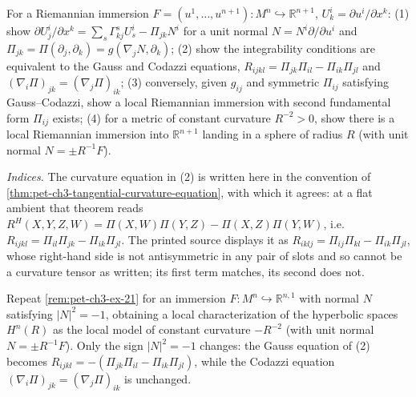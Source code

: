 \begin{remark}
  \label{rem:pet-ch3-ex-21}
  \leanok
  For a Riemannian immersion $F=(u^1,\dots,u^{n+1}):M^n\hookrightarrow\mathbb
  R^{n+1}$, $U^i_k=\partial u^i/\partial x^k$: (1) show
  $\partial U^i_j/\partial x^k=\sum_s\Gamma^s_{kj}U^i_s-\Pi_{jk}N^i$ for a unit normal
  $N=N^i\partial/\partial u^i$ and $\Pi_{jk}=\Pi(\partial_j,\partial_k)=g(\nabla_jN,\partial_k)$;
  (2) show the integrability conditions are equivalent to the Gauss and Codazzi
  equations, $R_{ijkl}=\Pi_{jk}\Pi_{il}-\Pi_{ik}\Pi_{jl}$ and
  $(\nabla_i\Pi)_{jk}=(\nabla_j\Pi)_{ik}$; (3) conversely, given
  $g_{ij}$ and symmetric $\Pi_{ij}$ satisfying Gauss--Codazzi, show a local
  Riemannian immersion with second fundamental form $\Pi_{ij}$ exists; (4) for a
  metric of constant curvature $R^{-2}>0$, show there is a local Riemannian
  immersion into $\mathbb R^{n+1}$ landing in a sphere of radius $R$ (with unit
  normal $N=\pm R^{-1}F$).

  \emph{Indices.} The curvature equation in (2) is written here in the convention
  of \cref{thm:pet-ch3-tangential-curvature-equation}, with which it agrees: at a
  flat ambient that theorem reads $R^H(X,Y,Z,W)=\Pi(X,W)\Pi(Y,Z)-\Pi(X,Z)\Pi(Y,W)$,
  i.e. $R_{ijkl}=\Pi_{il}\Pi_{jk}-\Pi_{ik}\Pi_{jl}$. The printed source displays
  it as $R_{iklj}=\Pi_{ij}\Pi_{kl}-\Pi_{ik}\Pi_{jl}$, whose right-hand side is not
  antisymmetric in any pair of slots and so cannot be a curvature tensor as
  written; its first term matches, its second does not.
\end{remark}

\begin{remark}
  \label{rem:pet-ch3-ex-22}
  \leanok
  Repeat \cref{rem:pet-ch3-ex-21} for an immersion $F:M^n\hookrightarrow\mathbb
  R^{n,1}$ with normal $N$ satisfying $|N|^2=-1$, obtaining a local
  characterization of the hyperbolic spaces $H^n(R)$ as the local model of
  constant curvature $-R^{-2}$ (with unit normal $N=\pm R^{-1}F$). Only the sign
  $|N|^2=-1$ changes: the Gauss equation of (2) becomes
  $R_{ijkl}=-(\Pi_{jk}\Pi_{il}-\Pi_{ik}\Pi_{jl})$, while the Codazzi equation
  $(\nabla_i\Pi)_{jk}=(\nabla_j\Pi)_{ik}$ is unchanged.
\end{remark}

